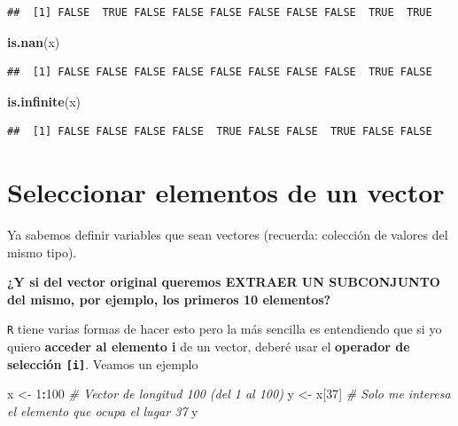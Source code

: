 \documentclass[11pt,]{book}
\newenvironment{Shaded}{\begin{snugshade}}{\end{snugshade}}
\newcommand{\CommentTok}[1]{\textcolor[rgb]{0.37,0.37,0.37}{\textit{#1}}}
\newcommand{\DecValTok}[1]{\textcolor[rgb]{0.06,0.06,0.06}{#1}}
\newcommand{\KeywordTok}[1]{\textcolor[rgb]{0.27,0.27,0.27}{\textbf{#1}}}
\newcommand{\NormalTok}[1]{#1}
\newcommand{\OperatorTok}[1]{\textcolor[rgb]{0.43,0.43,0.43}{\textbf{#1}}}
\newcommand{\StringTok}[1]{\textcolor[rgb]{0.5,0.5,0.5}{#1}}
\begin{document}
\begin{verbatim}
##  [1] FALSE  TRUE FALSE FALSE FALSE FALSE FALSE FALSE  TRUE  TRUE
\end{verbatim}

\begin{Shaded}
\begin{Highlighting}[]
\KeywordTok{is.nan}\NormalTok{(x)}
\end{Highlighting}
\end{Shaded}

\begin{verbatim}
##  [1] FALSE FALSE FALSE FALSE FALSE FALSE FALSE FALSE  TRUE FALSE
\end{verbatim}

\begin{Shaded}
\begin{Highlighting}[]
\KeywordTok{is.infinite}\NormalTok{(x)}
\end{Highlighting}
\end{Shaded}

\begin{verbatim}
##  [1] FALSE FALSE FALSE FALSE  TRUE FALSE FALSE  TRUE FALSE FALSE
\end{verbatim}

\hypertarget{seleccionar-elementos-de-un-vector}{%
\section{Seleccionar elementos de un vector}\label{seleccionar-elementos-de-un-vector}}

Ya sabemos definir variables que sean vectores (recuerda: colección de valores del mismo tipo).

\textbf{¿Y si del vector original queremos EXTRAER UN SUBCONJUNTO del mismo, por ejemplo, los primeros 10 elementos?}

\texttt{R} tiene varias formas de hacer esto pero la más sencilla es entendiendo que si yo quiero \textbf{acceder al elemento i} de un vector, deberé usar el \textbf{operador de selección \texttt{{[}i{]}}}. Veamos un ejemplo

\begin{Shaded}
\begin{Highlighting}[]
\NormalTok{x <-}\StringTok{ }\DecValTok{1}\OperatorTok{:}\DecValTok{100} \CommentTok{# Vector de longitud 100 (del 1 al 100)}
\NormalTok{y <-}\StringTok{ }\NormalTok{x[}\DecValTok{37}\NormalTok{] }\CommentTok{# Solo me interesa el elemento que ocupa el lugar 37}
\NormalTok{y}
\end{Highlighting}
\end{Shaded}
\end{document}
